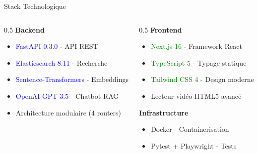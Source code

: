 \documentclass[11pt]{beamer}
\begin{document}
\begin{frame}{Stack Technologique}
\begin{columns}
\begin{column}{0.5\textwidth}
\textbf{Backend}
\begin{itemize}
    \item \textcolor{blue}{FastAPI 0.3.0} - API REST
    \item \textcolor{blue}{Elasticsearch 8.11} - Recherche
    \item \textcolor{blue}{Sentence-Transformers} - Embeddings
    \item \textcolor{blue}{OpenAI GPT-3.5} - Chatbot RAG
    \item Architecture modulaire (4 routers)
\end{itemize}
\end{column}

\begin{column}{0.5\textwidth}
\textbf{Frontend}
\begin{itemize}
    \item \textcolor{green}{Next.js 16} - Framework React
    \item \textcolor{green}{TypeScript 5} - Typage statique
    \item \textcolor{green}{Tailwind CSS 4} - Design moderne
    \item Lecteur vidéo HTML5 avancé
\end{itemize}

\vspace{0.3cm}

\textbf{Infrastructure}
\begin{itemize}
    \item Docker - Containerisation
    \item Pytest + Playwright - Tests
\end{itemize}
\end{column}
\end{columns}
\end{frame}
\end{document}
